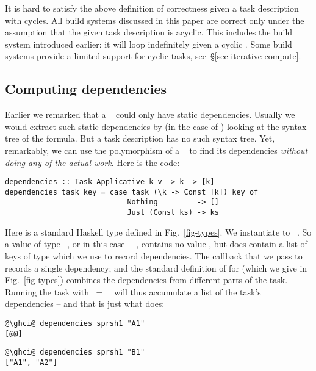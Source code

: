 It is hard to satisfy the above definition of correctness given a task
description with cycles. All build systems discussed in this paper are correct
only under the assumption that the given task description is acyclic. This
includes the  build system introduced earlier: it will loop
indefinitely given a cyclic . Some build systems provide a limited
support for cyclic tasks, see~\S\ref{sec-iterative-compute}.

\subsection{Computing dependencies}\label{sec-deps}

Earlier we remarked that a ~ could only have static
dependencies. Usually we would extract such static dependencies by (in the case
of \Excel) looking at the syntax tree of the formula.  But a task description
has no such syntax tree. Yet, remarkably, we can use the polymorphism of a
~ to find its dependencies \emph{without doing any of
the actual work}. Here is the code:
\vspace{1mm}
\begin{verbatim}
dependencies :: Task Applicative k v -> k -> [k]
dependencies task key = case task (\k -> Const [k]) key of
                            Nothing         -> []
                            Just (Const ks) -> ks
\end{verbatim}
\vspace{1mm}
Here  is a standard Haskell type defined in Fig.~\ref{fig-types}. We
instantiate  to ~\hs{[@@k]}.  So a value of type ~,
or in this case ~\hs{[@@k]}~, contains no value , but does
contain a list of keys of type \hs{[@@k]} which we use to record dependencies.
The  callback that we pass to  records a single dependency;
and the standard definition of  for  (which we give
in Fig.~\ref{fig-types}) combines the dependencies from different parts of the
task. Running the task with ~=~~\hs{[@@k]} will thus
accumulate a list of the task's dependencies -- and that is just what
 does:
\vspace{1mm}
\begin{verbatim}
@\ghci@ dependencies sprsh1 "A1"
[@@]
\end{verbatim}
\begin{verbatim}
@\ghci@ dependencies sprsh1 "B1"
["A1", "A2"]
\end{verbatim}
\vspace{1mm}

